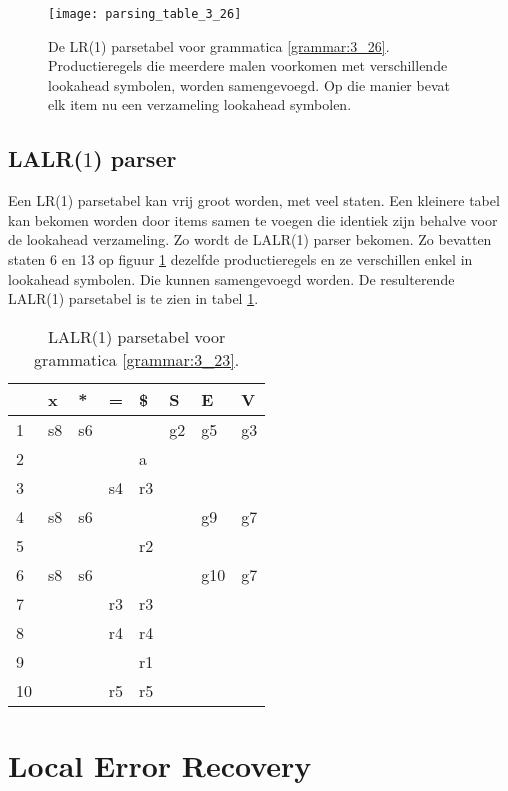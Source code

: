 \begin{figure}[ht]
	\centering
	\texttt{[image: parsing\_table\_3\_26]}
	\caption{De LR(1) parsetabel voor grammatica \ref{grammar:3_26}. Productieregels die meerdere malen voorkomen met verschillende lookahead symbolen, worden samengevoegd. Op die manier bevat elk item nu een verzameling lookahead symbolen.}
	\label{fig:parsing_table_3_26}
\end{figure}


\subsection{LALR($1$) parser}
Een LR(1) parsetabel kan vrij groot worden, met veel staten. Een kleinere tabel kan bekomen worden door items samen te voegen die identiek zijn behalve voor de lookahead verzameling. Zo wordt de LALR(1) parser bekomen. Zo bevatten staten 6 en 13 op figuur \ref{fig:parsing_table_3_26} dezelfde productieregels en ze verschillen enkel in lookahead symbolen. Die kunnen samengevoegd worden. De resulterende LALR(1) parsetabel is te zien in tabel \ref{table:slr_parse_table_3_26_LALR}. 

\begin{table}[ht]
	\centering
	\begin{tabular}{l|llll|lll|}
		& x   & *  & = & \$ & S  & E  & V \\
		\hline
		1 & s8  & s6 &   &    & g2 & g5 & g3 \\
		2 &     &    &   &  a &    &    &    \\
		3 &     &    & s4& r3 &    &    &    \\
		4 & s8  & s6 &   &    &    & g9 &  g7  \\
		5 &     &    &   & r2 &    &    &    \\
		6 & s8  & s6 &   &    &    & g10& g7\\
		7 &     &    & r3 & r3 &    &    &    \\
		8 &     &    &r4 & r4 &    &    &    \\
		9 &     &    &   & r1 &    &    &    \\
		10 &     &    & r5& r5 &    &    &    \\
		\hline
	\end{tabular}
	\caption{LALR(1) parsetabel voor grammatica \ref{grammar:3_23}.}
	\label{table:slr_parse_table_3_26_LALR}
\end{table}

\section{Local Error Recovery}